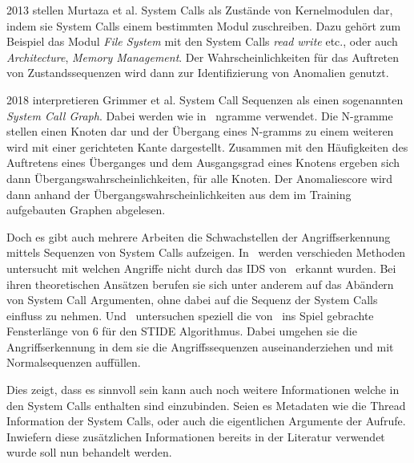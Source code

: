         2013 stellen Murtaza et al. System Calls als Zustände von Kernelmodulen dar, indem sie System Calls einem bestimmten Modul zuschreiben.
        Dazu gehört zum Beispiel das Modul \textit{File System} mit den System Calls \textit{read} \textit{write} etc., oder auch \textit{Architecture}, \textit{Memory Management}.
        Der Wahrscheinlichkeiten für das Auftreten von Zustandssequenzen wird dann zur Identifizierung von Anomalien genutzt.~\cite{SYSTEM_STATES}

        2018 interpretieren Grimmer et al. System Call Sequenzen als einen sogenannten \textit{System Call Graph}.
        Dabei werden wie in~\cite{STIDE_Alternatives} ngramme verwendet.
        Die N-gramme stellen einen Knoten dar und der Übergang eines N-gramms zu einem weiteren wird mit einer gerichteten Kante dargestellt.
        Zusammen mit den Häufigkeiten des Auftretens eines Überganges und dem Ausgangsgrad eines Knotens ergeben sich dann Übergangswahrscheinlichkeiten, für alle Knoten.
        Der Anomaliescore wird dann anhand der Übergangswahrscheinlichkeiten aus dem im Training aufgebauten Graphen abgelesen.~\cite{SYSCALL_GRAPHS} 


    Doch es gibt auch mehrere Arbeiten die Schwachstellen der Angriffserkennung mittels Sequenzen von System Calls aufzeigen.
    In~\cite{Syscallseqexploit1} werden verschieden Methoden untersucht mit welchen Angriffe nicht durch das IDS von~\cite{FORREST2000} erkannt wurden.
    Bei ihren theoretischen Ansätzen berufen sie sich unter anderem auf das Abändern von System Call Argumenten, ohne dabei auf die Sequenz der System Calls einfluss zu nehmen.
    Und~\cite{Syscallseqexploit3} untersuchen speziell die von~\cite{FORREST} ins Spiel gebrachte Fensterlänge von $6$ für den \ac{STIDE} Algorithmus.
    Dabei umgehen sie die Angriffserkennung in dem sie die Angriffssequenzen auseinanderziehen und mit Normalsequenzen auffüllen.

    Dies zeigt, dass es sinnvoll sein kann auch noch weitere Informationen welche in den System Calls enthalten sind einzubinden.
    Seien es Metadaten wie die Thread Information der System Calls, oder auch die eigentlichen Argumente der Aufrufe.
    Inwiefern diese zusätzlichen Informationen bereits in der Literatur verwendet wurde soll nun behandelt werden.

